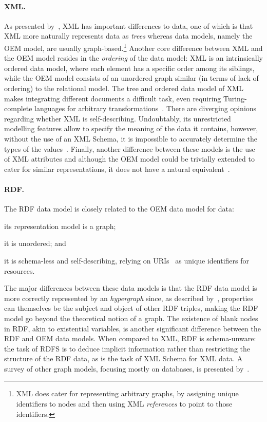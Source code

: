 \paragraph*{XML.}
%
As presented by~\citet{Suciu:1998aa}, \ac{XML} has important differences to \sd data, one of which is that \ac{XML} more
naturally represents data as \emph{trees} whereas \sd data models, namely the \ac{OEM} model, are usually
graph-based.\footnote{\ac{XML} does cater for representing arbitrary graphs, by assigning unique identifiers to nodes
  and then using \ac{XML} \emph{references} to point to those identifiers.}
%
Another core difference between \ac{XML} and the \ac{OEM} model resides in the \emph{ordering} of the data model:
\ac{XML} is an intrinsically ordered data model, where each element has a specific order among its siblings, while the
\ac{OEM} model consists of an unordered graph similar (in terms of lack of ordering) to the relational model.
%
The tree and ordered data model of \ac{XML} makes integrating different documents a difficult task, even requiring
Turing-complete languages for arbitrary transformations~\cite{Kepser:2004aa}.
%
There are diverging opinions regarding whether \ac{XML} is self-describing.  Undoubtably, its unrestricted modelling
features allow to specify the meaning of the data it contains, however, without the use of an \ac{XML} Schema, it is
impossible to accurately determine the types of the values~\cite{SimeonWadler:2003aa}.
%
Finally, another difference between these models is the use of \ac{XML} attributes and although the \ac{OEM} model could
be trivially extended to cater for similar representations, it does not have a natural equivalent~\cite{Suciu:1998aa}.


\paragraph*{RDF.}
%
The \ac{RDF} data model is closely related to the \ac{OEM} data model for \sd data:
%
\begin{inparaenum}[(i)]
\item its representation model is a graph;
\item it is unordered; and
\item it is schema-less and self-describing, relying on \acp{URI}~\cite{Berners-LeeFieldingMasinter:2005aa} as unique
  identifiers for resources.
\end{inparaenum}
%
The major differences between these data models is that the \ac{RDF} data model is more correctly represented by an
\emph{hypergraph} since, as described by~\citet{HayesGutierrez:2004aa}, properties can themselves be the subject and
object of other \ac{RDF} triples, making the \ac{RDF} model go beyond the theoretical notion of a graph.
%
The existence of blank nodes in \ac{RDF}, akin to existential variables, is another significant difference between the
\ac{RDF} and \ac{OEM} data models.
%
When compared to \ac{XML}, \ac{RDF} is schema-unware: the task of \ac{RDFS} is to deduce implicit information rather
than restricting the structure of the \ac{RDF} data, as is the task of \ac{XML} Schema for \ac{XML} data.
% 
A survey of other graph models, focusing mostly on databases, is presented by~\citet{AnglesGutierrez:2008ab}.


